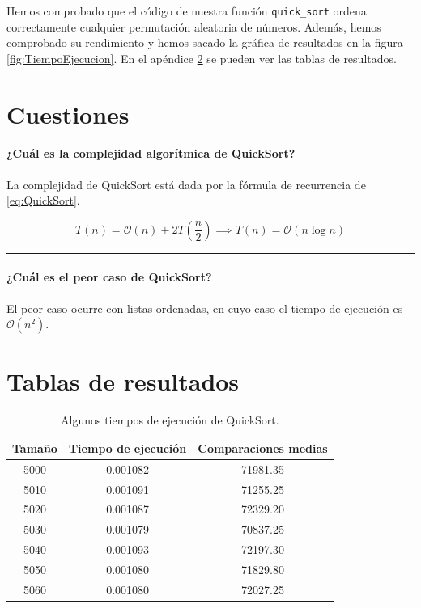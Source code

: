 \documentclass[12pt,a4paper,titlepage]{article}
\begin{document}
Hemos comprobado que el código de nuestra función \texttt{quick\_sort} ordena correctamente cualquier permutación aleatoria de números. Además, hemos comprobado su rendimiento y hemos sacado la gráfica de resultados en la figura \ref{fig:TiempoEjecucion}. En el apéndice \ref{sec:Apendice} se pueden ver las tablas de resultados.

\section{Cuestiones}

\paragraph{\textcolor{green!30!black}{¿Cuál es la complejidad algorítmica de QuickSort?}} La complejidad de QuickSort está dada por la fórmula de recurrencia de \eqref{eq:QuickSort}.

\begin{equation}
T(n) = \mathcal{O}(n) + 2 T \left(\frac{n}{2}\right) \implies T(n) = \mathcal{O}(n \log n)
\label{eq:QuickSort}
\end{equation}

\vspace{10pt} %
\hrule

\paragraph{\textcolor{green!30!black}{¿Cuál es el peor caso de QuickSort?}}
El peor caso ocurre con listas ordenadas, en cuyo caso el tiempo de ejecución es $\mathcal{O}(n^2)$.

\clearpage %
\appendix
\section{Tablas de resultados}
\label{sec:Apendice}

\begin{table}[hbtp]
\centering
\begin{tabular}{c|cc}
\toprule %
\textbf{Tamaño} & \textbf{Tiempo de ejecución} & \textbf{Comparaciones medias} \\ \midrule
5000 & 0.001082 & 71981.35 \\
5010 & 0.001091 & 71255.25 \\
5020 & 0.001087 & 72329.20 \\
5030 & 0.001079 & 70837.25 \\
5040 & 0.001093 & 72197.30 \\
5050 & 0.001080 & 71829.80 \\
5060 & 0.001080 & 72027.25 \\ \bottomrule
\end{tabular}
\caption{Algunos tiempos de ejecución de QuickSort.}
\label{tab:QuickSort}
\end{table}
\end{document}
